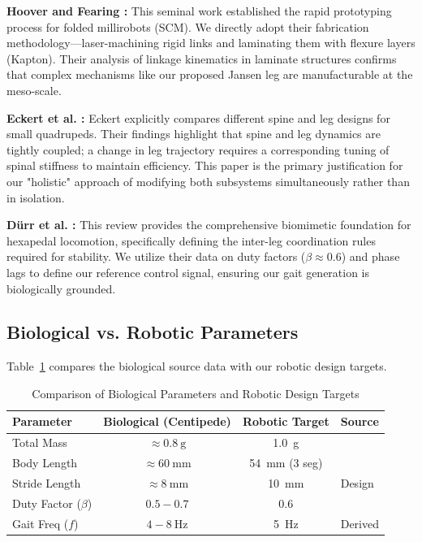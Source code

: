 \documentclass[11pt, letterpaper]{article}
\begin{document}
\textbf{Hoover and Fearing \cite{hoover2008fast}:} This seminal work established the rapid prototyping process for folded millirobots (SCM). We directly adopt their fabrication methodology—laser-machining rigid links and laminating them with flexure layers (Kapton). Their analysis of linkage kinematics in laminate structures confirms that complex mechanisms like our proposed Jansen leg are manufacturable at the meso-scale.

\textbf{Eckert et al. \cite{eckert2015spine}:} Eckert explicitly compares different spine and leg designs for small quadrupeds. Their findings highlight that spine and leg dynamics are tightly coupled; a change in leg trajectory requires a corresponding tuning of spinal stiffness to maintain efficiency. This paper is the primary justification for our "holistic" approach of modifying both subsystems simultaneously rather than in isolation.

\textbf{Dürr et al. \cite{durr2019integrative}:} This review provides the comprehensive biomimetic foundation for hexapedal locomotion, specifically defining the inter-leg coordination rules required for stability. We utilize their data on duty factors ($\beta \approx 0.6$) and phase lags to define our reference control signal, ensuring our gait generation is biologically grounded.

\subsection{Biological vs. Robotic Parameters}
Table~\ref{tab:bio_comp} compares the biological source data with our robotic design targets.

\begin{table}[ht]
  \centering
  \caption{Comparison of Biological Parameters and Robotic Design Targets}
  \label{tab:bio_comp}
  \begin{tabular}{lccl}
    \toprule
    \textbf{Parameter} & \textbf{Biological (Centipede)} & \textbf{Robotic Target} & \textbf{Source} \\
    \midrule
    Total Mass & $\approx \SI{0.8}{\gram}$ & \SI{1.0}{\gram} & \cite{hoffman2011myriapod, durr2019integrative} \\
    Body Length & $\approx \SI{60}{\milli\meter}$ & \SI{54}{\milli\meter} (3 seg) & \cite{hoffman2011myriapod} \\
    Stride Length & $\approx \SI{8}{\milli\meter}$ & \SI{10}{\milli\meter} & Design \\
    Duty Factor ($\beta$) & $0.5 - 0.7$ & $0.6$ & \cite{durr2019integrative} \\
    Gait Freq ($f$) & $4 - \SI{8}{\hertz}$ & \SI{5}{\hertz} & Derived \\
    \bottomrule
  \end{tabular}
\end{table}
\end{document}
